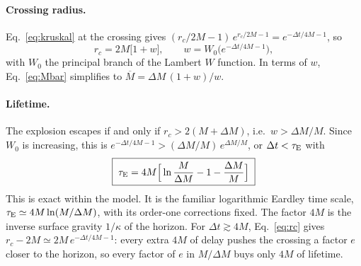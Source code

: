 \documentclass[11pt,a4paper]{article}
\newcommand{\dM}{\Delta M}
\newcommand{\tauE}{\tau_{\rm E}}
\begin{document}
\paragraph{Crossing radius.} Eq.~\eqref{eq:kruskal} at the crossing gives $(r_c/2M-1)\,e^{r_c/2M-1} = e^{-\Delta t/4M-1}$, so
\begin{equation}
r_c = 2M\big[1+w\big],\qquad w = W_0\!\big(e^{-\Delta t/4M-1}\big),
\label{eq:rc}
\end{equation}
with $W_0$ the principal branch of the Lambert $W$ function. In terms of $w$, Eq.~\eqref{eq:Mbar} simplifies to $\overline M = \dM\,(1+w)/w$.

\paragraph{Lifetime.} The explosion escapes if and only if $r_c > 2(M+\dM)$, i.e.\ $w > \dM/M$. Since $W_0$ is increasing, this is $e^{-\Delta t/4M-1} > (\dM/M)\,e^{\dM/M}$, or $\Delta t < \tauE$ with
\begin{equation}
\boxed{\;\tauE = 4M\Big[\ln\frac{M}{\dM} - 1 - \frac{\dM}{M}\Big]\;}
\label{eq:tau}
\end{equation}
This is exact within the model. It is the familiar logarithmic Eardley time scale, $\tauE \simeq 4M\ln(M/\dM)$, with its order-one corrections fixed. The factor $4M$ is the inverse surface gravity $1/\kappa$ of the horizon. For $\Delta t \gtrsim 4M$, Eq.~\eqref{eq:rc} gives $r_c - 2M \simeq 2M\,e^{-\Delta t/4M-1}$: every extra $4M$ of delay pushes the crossing a factor $e$ closer to the horizon, so every factor of $e$ in $M/\dM$ buys only $4M$ of lifetime.
\end{document}
